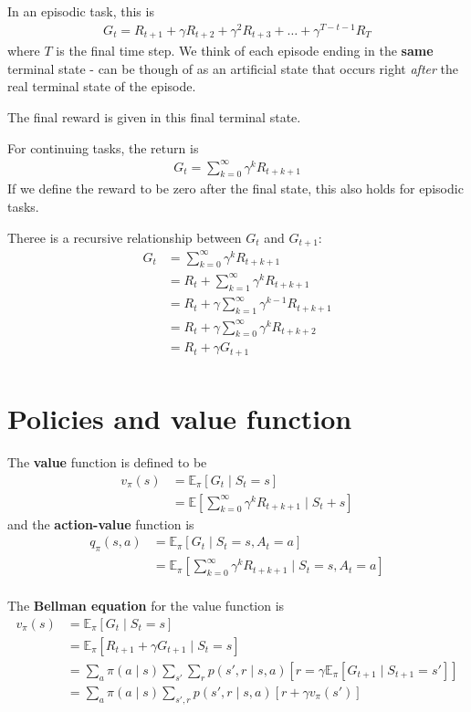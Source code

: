 \documentclass[a4paper,11pt,reqno]{amsart}
\begin{document}
In an episodic task, this is
\begin{align}
G_t = R_{t + 1} + \gamma R_{t + 2} + \gamma^{2} R_{t + 3} + \ldots + \gamma^{T  - t - 1} R_T
\end{align}
where $T$ is the final time step. We think of each episode ending in the \textbf{same} terminal state - can be though of as an artificial state that occurs right \emph{after} the real terminal state of the episode. 

The final reward is given in this final terminal state. 

For continuing tasks, the return is
\begin{align}
G_t = \sum_{k=0}^{\infty} \gamma ^{k}R_{t + k + 1}
\end{align}
If we define the reward to be zero after the final state, this also holds for episodic tasks.

Theree is a recursive relationship between $G_t$ and $G_{t + 1}$: 
\begin{align}
    G_t &= \sum_{k=0}^{\infty} \gamma ^{k}R_{t + k + 1}\\
&= R_t + \sum_{k=1}^{\infty} \gamma ^{k}R_{t + k + 1} \\
&= R_t + \gamma \sum_{k=1}^{\infty} \gamma ^{k - 1}R_{t + k + 1} \\
&= R_t + \gamma \sum_{k=0}^{\infty}\gamma ^{k} R_{t + k + 2} \\
&= R_t + \gamma G_{t + 1} \\
\end{align}

\section*{Policies and value function}
The \textbf{value} function is defined to be
\begin{align}
    v_{\pi }(s) &= \mathbb{E}_\pi \left[ G_t \mid S_t = s \right]\\  
    &= \mathbb{E}\left[ \sum_{k=0}^{\infty} \gamma ^{k}R_{t+k+1} \;\Bigg | \;  S_t + s \right] 
\end{align}
and the \textbf{action-value} function is
\begin{align}
q_\pi (s, a) &= \mathbb{E}_\pi \left[ G_t \mid S_t = s, A_t = a \right]  \\
&= \mathbb{E}_\pi \left[ \sum_{k=0}^{\infty} \gamma ^{k}R_{t + k + 1} \;\Bigg | \; S_t = s, A_t = a \right]  \\
\end{align}

The \textbf{Bellman equation} for the value function is
\begin{align}
v_\pi (s) &= \mathbb{E}_\pi \left[ G_t \mid S_t = s \right]  \\
&= \mathbb{E}_\pi \left[ R_{t + 1} + \gamma G_{t + 1} \mid S_t = s \right]  \\
&= \sum_{a} \pi (a \mid s) \sum_{s'} \sum_{r} p(s', r \mid s, a) \left[ r = \gamma \mathbb{E}_\pi \left[ G_{t + 1} \mid S_{t + 1} = s' \right]  \right]  \\
&= \sum_{a} \pi (a \mid s) \sum_{s', r} p(s', r \mid s, a) \left[ r + \gamma v_\pi (s') \right]  \\
\end{align}
\end{document}
